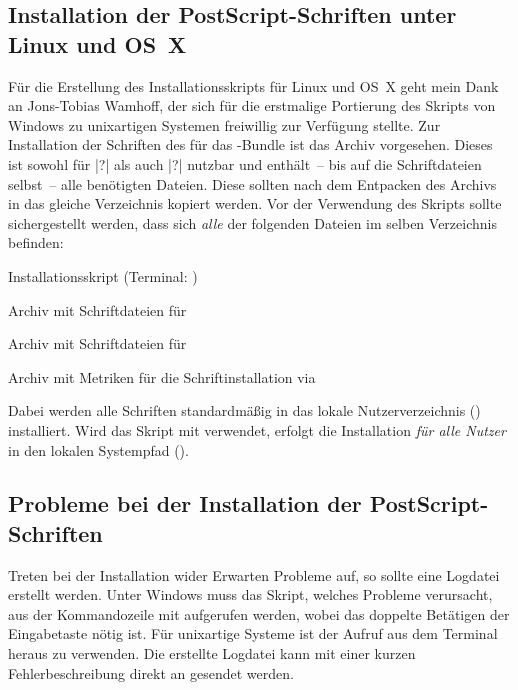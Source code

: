 \subsection{Installation der PostScript-Schriften unter Linux und OS~X}
\label{sec:install:unix}
Für die Erstellung des Installationsskripts für Linux und OS~X geht mein Dank 
an Jons-Tobias Wamhoff, der sich für die erstmalige Portierung des Skripts 
von Windows zu unixartigen Systemen freiwillig zur Verfügung stellte.
Zur Installation der Schriften des \CDs für das \TUDScript-Bundle ist das Archiv
%
{} vorgesehen. Dieses ist sowohl für 
|?| als auch |?| 
nutzbar und enthält~-- bis auf die Schriftdateien selbst~-- alle benötigten 
Dateien. Diese sollten nach dem Entpacken des Archivs in das gleiche 
Verzeichnis kopiert werden. Vor der Verwendung des Skripts 
 sollte sichergestellt werden, dass sich 
\emph{alle} der folgenden Dateien im selben Verzeichnis befinden:
%
\settowidth{}%
\begin{description}[labelwidth=\tempdim,labelsep=1em]
  \item[\File{tudscrfonts\_install.sh}]Installationsskript
    (Terminal: )
  \item[\File{Univers\_PS.zip}]Archiv mit Schriftdateien für \Univers
  \item[\File{DIN\_Bd\_PS.zip}]Archiv mit Schriftdateien für \DIN
  \item[\File{tudscrfonts.zip}]Archiv mit Metriken für die
    Schriftinstallation via 
\end{description}
%
Dabei werden alle Schriften standardmäßig in das lokale Nutzerverzeichnis 
() installiert. Wird das Skript mit  verwendet, 
erfolgt die Installation \emph{für alle Nutzer} in den lokalen Systempfad 
().



\subsection{Probleme bei der Installation der PostScript-Schriften}
Treten bei der Installation wider Erwarten Probleme auf, so sollte eine 
Logdatei erstellt werden. Unter Windows muss das Skript, welches Probleme 
verursacht, aus der Kommandozeile mit
 aufgerufen werden, wobei das 
doppelte Betätigen der Eingabetaste nötig ist. Für unixartige Systeme 
ist der Aufruf  aus dem 
Terminal heraus zu verwenden. Die erstellte Logdatei kann mit einer kurzen 
Fehlerbeschreibung direkt an \Email{\tudscrmail} gesendet werden.



